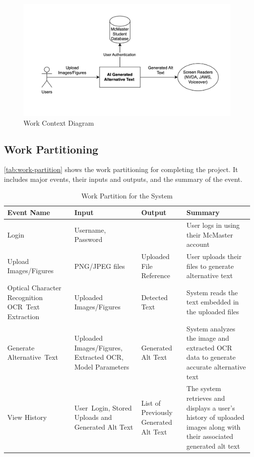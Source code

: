 \documentclass[12pt]{article}
\begin{document}
\begin{figure}[H] %
  \centering
  \includegraphics[width=\textwidth]{images/work-context-diagram.png}
  \caption{Work Context Diagram}
  \label{fig:work-context}
\end{figure}
\FloatBarrier   %

\subsection{Work Partitioning}
\autoref{tab:work-partition} shows the work partitioning for
completing the project. It includes major events,
their inputs and outputs, and the summary of the event.

\begin{table}[H]
  \centering
  \caption{Work Partition for the System}
  \label{tab:work-partition}
  \begin{tabular}{ |p{3cm}|p{3cm}|p{3cm}|p{4cm}| }
    \hline
    \textbf{Event Name} & \textbf{Input} & \textbf{Output} & \textbf{Summary} \\
    \hline
    Login & Username, Password &  & User logs in using their McMaster account \\
    \hline
    Upload \mbox{Images/Figures} & PNG/JPEG files & Uploaded File
    Reference & User uploads their files to generate alternative text \\
    \hline
    Optical Character Recognition \mbox{OCR Text} \mbox{Extraction} & Uploaded
    \mbox{Images/Figures} & Detected Text & System reads the text
    embedded in the uploaded files \\
    \hline
    Generate \mbox{Alternative Text} & Uploaded
    \mbox{Images/Figures}, Extracted OCR, Model Parameters &
    Generated Alt Text & System analyzes the image and extracted OCR data to
    generate accurate alternative text \\
    \hline
    View History & \mbox{User Login,} Stored Uploads and Generated
    Alt Text & List of Previously Generated Alt Text & The system
    retrieves and displays a user’s history of uploaded images along
    with their associated generated alt text \\
    \hline
  \end{tabular} 
\end{table}
\end{document}
